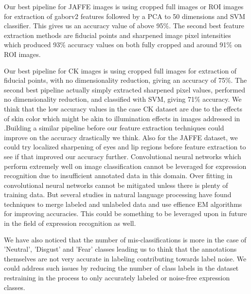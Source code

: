 \documentclass[10pt,twocolumn,letterpaper]{article}
\begin{document}
Our best pipeline for JAFFE images is using cropped full images or ROI images for extraction of gaborv2 features followed by a PCA to 50 dimensions and SVM classifier. This gives us an accuracy value of above 95\%. The second best feature extraction methods are fiducial points and sharpened image pixel intensities which produced 93\% accuracy values on both fully cropped and around 91\% on ROI images. 

Our best pipeline for CK images is using cropped full images for extraction of fiducial points, with no dimensionality reduction, giving an accuracy of 75\%. The second best pipeline actually simply extracted sharpened pixel values, performed no dimensionality reduction, and classified with SVM, giving 71\% accuracy. We think that the low accuracy values in the case CK dataset are due to the effects of skin color which might be akin to illumination effects in images addressed in \cite{FERvariablelighting}.Building a similar pipeline before our feature extraction techniques could improve on the accuracy drastically we think. Also for the JAFFE dataset, we could try localized sharpening of eyes and lip regions before feature extraction to see if that improved our accuracy further. Convolutional neural networks which perform extremely well on image classification cannot be leveraged for expression recognition due to insufficient annotated data in this domain. Over fitting in convolutional neural networks cannot be mitigated unless there is plenty of training data. But several studies in natural language processing \cite{nigam2006} have found techniques to merge labeled and unlabeled data and use effience EM algorithms for improving accuracies. This could be something to be leveraged upon in future in the field of expression recognition as well.

We have also noticed that the number of mis-classifications is more in the case of 'Neutral', 'Disgust' and 'Fear' classes leading us to think that the annotations themselves are not very accurate in labeling contributing towards label noise. We could address such issues by reducing the number of class labels in the dataset restraining in the process to only accurately labeled or  noise-free expression classes.\\
\end{document}

